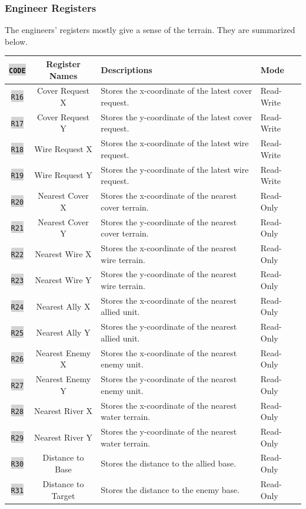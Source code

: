 \documentclass{article}
\newcommand{\vnscode}[1]{\colorbox{lightgray}{\lstinline[language=vns]{#1}}}
\begin{document}
\subsubsection{Engineer Registers}

The engineers' registers mostly give a sense of the terrain. They are summarized
below.

\begin{minipage}{\textwidth}
\centering
\begin{tabular}{|c|c|l|l|}
    \hline \vnscode{CODE} & Register Names & Descriptions & Mode \\ \hline
    \vnscode{R16} & Cover Request X & Stores the x-coordinate of the latest cover request. & Read-Write \\ \hline
    \vnscode{R17} & Cover Request Y & Stores the y-coordinate of the latest cover request. & Read-Write \\ \hline
    \vnscode{R18} & Wire Request X & Stores the x-coordinate of the latest wire request. & Read-Write \\ \hline
    \vnscode{R19} & Wire Request Y & Stores the y-coordinate of the latest wire request. & Read-Write \\ \hline
    \vnscode{R20} & Nearest Cover X & Stores the x-coordinate of the nearest cover terrain. & Read-Only \\ \hline
    \vnscode{R21} & Nearest Cover Y & Stores the y-coordinate of the nearest cover terrain. & Read-Only \\ \hline
    \vnscode{R22} & Nearest Wire X & Stores the x-coordinate of the nearest wire terrain. & Read-Only \\ \hline
    \vnscode{R23} & Nearest Wire Y & Stores the y-coordinate of the nearest wire terrain. & Read-Only \\ \hline
    \vnscode{R24} & Nearest Ally X & Stores the x-coordinate of the nearest allied unit. & Read-Only \\ \hline
    \vnscode{R25} & Nearest Ally Y & Stores the y-coordinate of the nearest allied unit. & Read-Only \\ \hline
    \vnscode{R26} & Nearest Enemy X & Stores the x-coordinate of the nearest enemy unit. & Read-Only \\ \hline
    \vnscode{R27} & Nearest Enemy Y & Stores the y-coordinate of the nearest enemy unit. & Read-Only \\ \hline
    \vnscode{R28} & Nearest River X & Stores the x-coordinate of the nearest water terrain. & Read-Only \\ \hline
    \vnscode{R29} & Nearest River Y & Stores the y-coordinate of the nearest water terrain. & Read-Only \\ \hline
    \vnscode{R30} & Distance to Base & Stores the distance to the allied base. & Read-Only \\ \hline
    \vnscode{R31} & Distance to Target & Stores the distance to the enemy base.  & Read-Only \\ \hline
\end{tabular}
\end{minipage}
\end{document}
